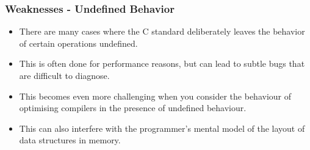 \documentclass{beamer}
\begin{document}
\begin{frame}
    \frametitle{Weaknesses - Undefined Behavior}

    \begin{itemize}
        \item There are many cases where the C standard deliberately leaves the behavior of certain operations undefined.
        \item This is often done for performance reasons, but can lead to subtle bugs that are difficult to diagnose.
        \item This becomes even more challenging when you consider the behaviour of optimising compilers in the presence of undefined behaviour.
        \item This can also interfere with the programmer's mental model of the layout of data structures in memory.
    \end{itemize}
\end{frame}










\end{document}
